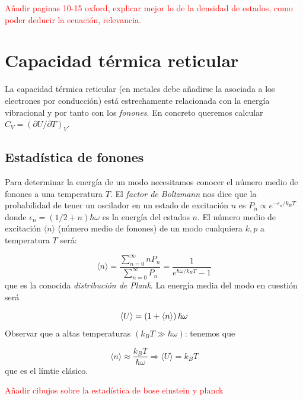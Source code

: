 \begin{Anotacion}
	\textcolor{red}{Añadir paginas 10-15 oxford, explicar mejor lo de la densidad de estados, como poder deducir la ecuación, relevancia.}
\end{Anotacion}


\section{Capacidad térmica reticular}

La capacidad térmica reticular (en metales debe añadirse la asociada a los electrones por conducción) está estrechamente relacionada con la energía vibracional y por tanto con los \textit{fonones}. En concreto queremos calcular $C_V = (\partial U / \partial T)_V$. 

\subsection{Estadística de fonones}

Para determinar la energía de un modo necesitamos conocer el número medio de fonones a una temperatura $T$. El \textit{factor de Boltzmann} nos dice que la probabilidad de tener un oscilador en un estado de excitación $n$ es $P_n \propto e^{-\epsilon_n/k_B T}$ donde $\epsilon_n = (1/2+n)\hbar \omega$ es la energía del estados $n$. El número medio de excitación $\langle n \rangle$ (número medio de fonones) de un modo cualquiera $k,p$ a temperatura $T$ será:

\begin{equation}
    \langle n \rangle = \frac{\sum_{n=0}^\infty n P_n}{\sum_{n=0}^{\infty} P_n} = \frac{1}{e^{\hbar \omega/k_B T} -1}
\end{equation}
que es la conocida \textit{distribución de Plank}. La energía media del modo en cuestión será

\begin{equation}
    \langle U \rangle = \left( 1+\langle n \rangle \right) \hbar \omega
\end{equation}
Observar que a altas temperaturas $(k_B T \gg \hbar \omega)$: tenemos que

\begin{equation}
    \langle n \rangle \approx \frac{k_B T}{\hbar \omega} \Longrightarrow \langle U \rangle = k_B T
\end{equation}
que es el límtie clásico. 
\begin{Anotacion}
	\textcolor{red}{Añadir cibujos sobre la estadística de bose einstein y planck}
\end{Anotacion}


